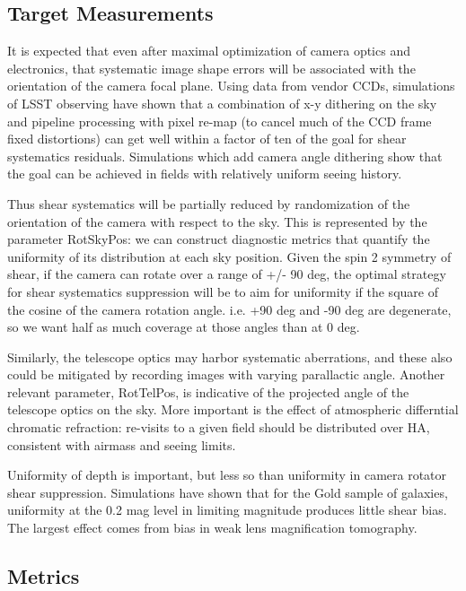 \subsection{Target Measurements}

It is expected that even after maximal optimization of camera optics
and electronics, that systematic image shape errors will be associated
with the orientation of the camera focal plane.  Using data from vendor CCDs, simulations
of LSST observing have shown that a combination of x-y dithering on the sky and
pipeline processing with pixel re-map (to cancel much of the CCD frame fixed
distortions) can get well within a factor of ten of the goal for shear
systematics residuals.  Simulations which add camera angle dithering show
that the goal can be achieved in fields with relatively uniform seeing history.

Thus shear systematics will be partially reduced by randomization of the
orientation of the camera with respect to the sky.  This is
represented by the parameter RotSkyPos: we can construct diagnostic
metrics that quantify the uniformity of its distribution at each sky
position.   Given the spin 2 symmetry of shear, if the camera can rotate over a range of +/-
90 deg, the optimal strategy for shear systematics suppression will be to aim for
uniformity if the square of the cosine of the camera rotation angle.  i.e. +90 deg
and -90 deg are degenerate, so we want half as much coverage at those angles than at 0 deg.

Similarly, the telescope optics may harbor systematic aberrations, and
these also could be mitigated by recording images with varying
parallactic angle.  Another relevant parameter, RotTelPos, is
indicative of the projected angle of the telescope optics on the sky. More
important is the effect of atmospheric differntial chromatic refraction: re-visits to a given
field should be distributed over HA, consistent with airmass and seeing limits.

Uniformity of depth is important, but less so than uniformity in camera
rotator shear suppression.  Simulations have shown that for the Gold sample of galaxies,
uniformity at the 0.2 mag level in limiting magnitude produces little shear bias. The
largest effect comes from bias in weak lens magnification tomography.


\subsection{Metrics}

